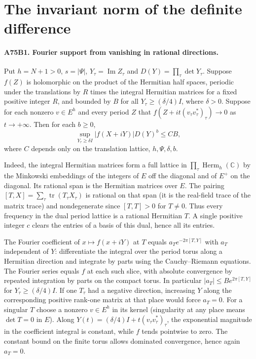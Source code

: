 \section{The invariant norm of the definite difference}

\paragraph{A75B1. Fourier support from vanishing in rational directions.}
Put $h=N+1>0$, $s=|\Psi|$, $Y_\tau=\operatorname{Im}Z_\tau$ and
$D(Y)=\prod_\tau\det Y_\tau$. Suppose $f(Z)$ is holomorphic on the
product of the Hermitian half spaces, periodic under the translations
by $R$ times the integral Hermitian matrices for a fixed positive
integer $R$, and bounded by $B$ for all $Y_\tau\ge (\delta/4)I$,
where $\delta>0$. Suppose for each nonzero $v\in E^h$ and every
period $Z$ that $f(Z+it(v_\tau v_\tau^*)_\tau)\to0$ as
$t\to+\infty$. Then for each $b\ge0$,
\[
  \sup_{Y_\tau\ge\delta I}|f(X+iY)|D(Y)^b\le C B,
\]
where $C$ depends only on the translation lattice, $h,\Psi,\delta,b$.

Indeed, the integral Hermitian matrices form a full lattice in
$\prod_\tau\operatorname{Herm}_h(\mathbb C)$ by the Minkowski
embeddings of the integers of $E$ off the diagonal and of $E^+$ on
the diagonal. Its rational span is the Hermitian matrices over $E$.
The pairing $[T,X]=\sum_\tau\operatorname{tr}(T_\tau X_\tau)$
is rational on that span (it is the real-field trace of the matrix
trace) and nondegenerate since $[T,T]>0$ for $T\ne0$. Thus every
frequency in the dual period lattice is a rational Hermitian $T$.
A single positive integer $c$ clears the entries of a basis of this
dual, hence all its entries.

The Fourier coefficient of $x\mapsto f(x+iY)$ at $T$ equals
$a_T e^{-2\pi[T,Y]}$ with $a_T$ independent of $Y$: differentiate
the integral over the period torus along a Hermitian direction and
integrate by parts using the Cauchy--Riemann equations. The Fourier
series equals $f$ at each such slice, with absolute convergence by
repeated integration by parts on the compact torus. In particular
$|a_T|\le B e^{2\pi[T,Y]}$ for $Y_\tau\ge(\delta/4)I$.
If one $T_\tau$ had a negative direction, increasing $Y$ along the
corresponding positive rank-one matrix at that place would force
$a_T=0$. For a singular $T$ choose a nonzero $v\in E^h$ in its
kernel (singularity at any place means $\det T=0$ in $E$). Along
$Y(t)=(\delta/4)I+t(v_\tau v_\tau^*)_\tau$, the exponential
magnitude in the coefficient integral is constant, while $f$
tends pointwise to zero. The constant bound on the finite torus
allows dominated convergence, hence again $a_T=0$.

